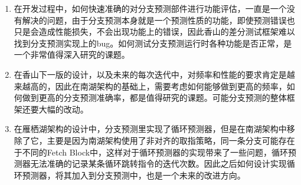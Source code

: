 \begin{enumerate}
    \item 在开发过程中，如何快速准确的对分支预测部件进行功能评估，一直是一个没有解决的问题，由于分支预测本身就是一个预测性质的功能，即使预测错误也只是会造成性能损失，不会出现功能上的错误，因此香山的差分测试框架难以找到分支预测实现上的bug。如何测试分支预测运行时各种功能是否正常，是一个非常值得深入研究的课题。
    \item 在香山下一版的设计，以及未来的每次迭代中，对频率和性能的要求肯定是越来越高的，因此在南湖架构的基础上，需要考虑如何能够做到更高的频率，如何做到更高的分支预测准确率，都是值得研究的课题。可能分支预测的整体框架还要大幅的改动。
    \item 在雁栖湖架构的设计中，分支预测里实现了循环预测器，但是在南湖架构中移除了它，主要是因为南湖架构使用了非对齐的取指策略，同一条分支可能存在于不同的Fetch Block中，这样对于循环预测器的实现带来了一些问题，循环预测器无法准确的记录某条循环跳转指令的迭代次数。因此之后如何设计实现循环预测器，将其加入到分支预测中，也是一个未来的改进方向。
\end{enumerate}

